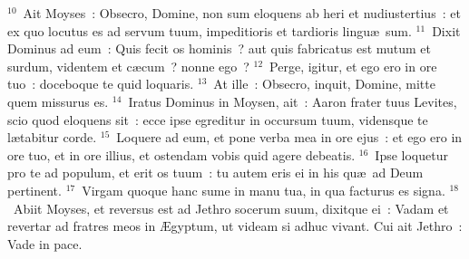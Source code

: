 ${}^{10}$~Ait Moyses~: Obsecro, Domine, non sum eloquens ab heri et nudiustertius~: et ex quo locutus es ad servum tuum, impeditioris et tardioris lingu\ae\ sum.
${}^{11}$~Dixit Dominus ad eum~: Quis fecit os hominis~? aut quis fabricatus est mutum et surdum, videntem et c\ae cum~? nonne ego~?
${}^{12}$~Perge, igitur, et ego ero in ore tuo~: doceboque te quid loquaris.
${}^{13}$~At ille~: Obsecro, inquit, Domine, mitte quem missurus es.
${}^{14}$~Iratus Dominus in Moysen, ait~: Aaron frater tuus Levites, scio quod eloquens sit~: ecce ipse egreditur in occursum tuum, vidensque te l\ae tabitur corde.
${}^{15}$~Loquere ad eum, et pone verba mea in ore ejus~: et ego ero in ore tuo, et in ore illius, et ostendam vobis quid agere debeatis.
${}^{16}$~Ipse loquetur pro te ad populum, et erit os tuum~: tu autem eris ei in his qu\ae\ ad Deum pertinent.
${}^{17}$~Virgam quoque hanc sume in manu tua, in qua facturus es signa.
${}^{18}$~Abiit Moyses, et reversus est ad Jethro socerum suum, dixitque ei~: Vadam et revertar ad fratres meos in \AE gyptum, ut videam si adhuc vivant. Cui ait Jethro~: Vade in pace.


